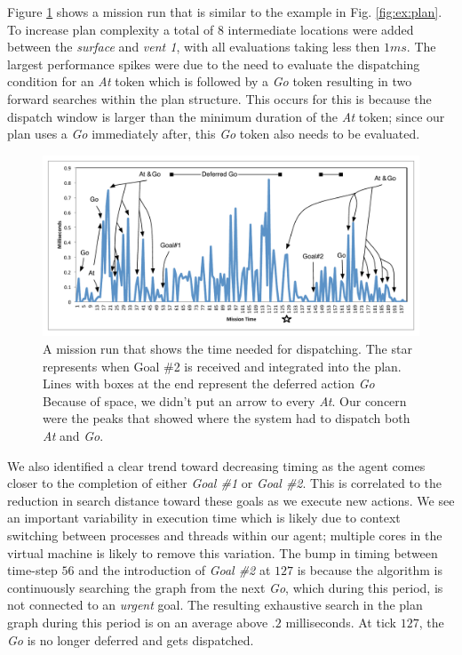 Figure \ref{fig:example_run} shows a mission run that is similar to
the example in Fig. \ref{fig:ex:plan}.  To increase plan complexity a
total of $8$ intermediate locations were added between the {\em
  surface} and {\em vent 1}, with all evaluations taking less then
$1ms$. The largest performance spikes were due to the need to evaluate
the dispatching condition for an {\em At} token which is followed by a
{\em Go} token resulting in two forward searches within the plan
structure. This occurs for this is because the dispatch window is
larger than the minimum duration of the {\em At} token; since our plan
uses a {\em Go} immediately after, this \emph{Go} token also needs to
be evaluated.

\begin{figure}[t]
  \centering
  \includegraphics[width=1.2\columnwidth]{figs/example_run.pdf}
  \caption{\small A mission run that shows the time needed for
    dispatching. The star represents when Goal \#2 is received and
    integrated into the plan. Lines with boxes at the end represent
    the deferred action {\em Go} Because of space, we didn't put an
    arrow to every {\em At}. Our concern were the peaks that showed
    where the system had to dispatch both {\em At} and {\em Go}. }
  \label{fig:example_run}
  \vskip-5mm
\end{figure}


We also identified a clear trend toward decreasing timing as the agent
comes closer to the completion of either {\em Goal \#1} or {\em Goal
  \#2}. This is correlated to the reduction in search distance toward
these goals as we execute new actions.  We see an important
variability in execution time which is likely due to context switching
between processes and threads within our agent; multiple cores in the
virtual machine is likely to remove this variation.  The bump in
timing between time-step $56$ and the introduction of {\em Goal \#2}
at $127$ is because the algorithm is continuously searching the graph
from the next {\em Go}, which during this period, is not connected to
an {\em urgent} goal. The resulting exhaustive search in the plan
graph during this period is on an average above $.2$ milliseconds. At
tick $127$, the {\em Go} is no longer deferred and gets dispatched.

